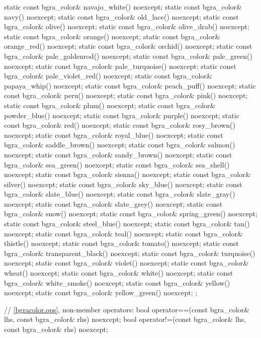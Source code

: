 \begin{codeblock}
{{{{{    static const bgra_color& navajo_white() noexcept;
    static const bgra_color& navy() noexcept;
    static const bgra_color& old_lace() noexcept;
    static const bgra_color& olive() noexcept;
    static const bgra_color& olive_drab() noexcept;
    static const bgra_color& orange() noexcept;
    static const bgra_color& orange_red() noexcept;
    static const bgra_color& orchid() noexcept;
    static const bgra_color& pale_goldenrod() noexcept;
    static const bgra_color& pale_green() noexcept;
    static const bgra_color& pale_turquoise() noexcept;
    static const bgra_color& pale_violet_red() noexcept;
    static const bgra_color& papaya_whip() noexcept;
    static const bgra_color& peach_puff() noexcept;
    static const bgra_color& peru() noexcept;
    static const bgra_color& pink() noexcept;
    static const bgra_color& plum() noexcept;
    static const bgra_color& powder_blue() noexcept;
    static const bgra_color& purple() noexcept;
    static const bgra_color& red() noexcept;
    static const bgra_color& rosy_brown() noexcept;
    static const bgra_color& royal_blue() noexcept;
    static const bgra_color& saddle_brown() noexcept;
    static const bgra_color& salmon() noexcept;
    static const bgra_color& sandy_brown() noexcept;
    static const bgra_color& sea_green() noexcept;
    static const bgra_color& sea_shell() noexcept;
    static const bgra_color& sienna() noexcept;
    static const bgra_color& silver() noexcept;
    static const bgra_color& sky_blue() noexcept;
    static const bgra_color& slate_blue() noexcept;
    static const bgra_color& slate_gray() noexcept;
    static const bgra_color& slate_grey() noexcept;
    static const bgra_color& snow() noexcept;
    static const bgra_color& spring_green() noexcept;
    static const bgra_color& steel_blue() noexcept;
    static const bgra_color& tan() noexcept;
    static const bgra_color& teal() noexcept;
    static const bgra_color& thistle() noexcept;
    static const bgra_color& tomato() noexcept;
    static const bgra_color& transparent_black() noexcept;
    static const bgra_color& turquoise() noexcept;
    static const bgra_color& violet() noexcept;
    static const bgra_color& wheat() noexcept;
    static const bgra_color& white() noexcept;
    static const bgra_color& white_smoke() noexcept;
    static const bgra_color& yellow() noexcept;
    static const bgra_color& yellow_green() noexcept;
  };

  // \ref{bgracolor.ops}, non-member operators:
  bool operator==(const bgra_color& lhs, const bgra_color& rhs) noexcept;
  bool operator!=(const bgra_color& lhs, const bgra_color& rhs) noexcept;
} } } }
\end{codeblock}

